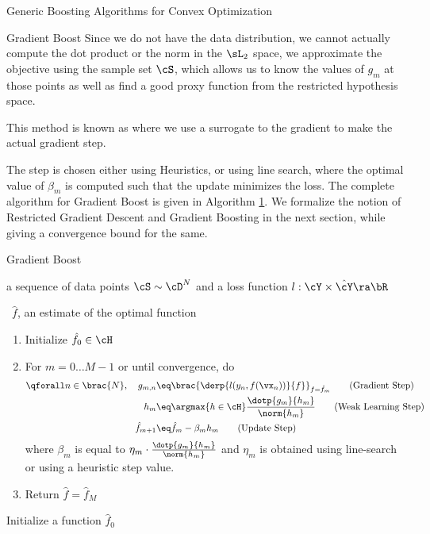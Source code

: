 \documentclass{article}
\begin{document}
\begin{psection}{Generic Boosting Algorithms for Convex Optimization}
\begin{psubsection}{Gradient Boost}
		Since we do not have the data distribution, we cannot actually compute the dot product or the norm in the $\sL_2$ space, we approximate the objective using the sample set $\cS$, which allows us to know the values of $g_m$ at those points as well as find a good proxy function from the restricted hypothesis space.

		This method is known as  where we use a surrogate to the gradient to make the actual gradient step.

		The step is chosen either using Heuristics, or using line search, where the optimal value of $\beta_m$ is computed such that the update minimizes the loss. The complete algorithm for Gradient Boost is given in Algorithm \hyperlink{algo:1}{1}. We formalize the notion of Restricted Gradient Descent and Gradient Boosting in the next section, while giving a convergence bound for the same.

	\end{psubsection}

	\begin{algo}[0.8\textwidth]{Gradient Boost}

		 \quad a sequence of data points $\cS \sim \cD^N$ and a loss function $l : \cY \times \hat{\cY} \ra \bR$ \sbr

		\, $\hat{f}$, an estimate of the optimal function


		\begin{enumerate}
			\item Initialize $\hat{f}_0 \in \cH$
			\item For $m = 0 \dots M - 1$ or until convergence, do
				\begin{align}
					\qforall n \in \brac{N}, \quad g_{m, n}	&\eq	\brac{\derp{l(y_n, f(\vx_n))}{f}}_{f = \hat{f}_{m}} \tag{Gradient Step} \\
					h_m										&\eq	\argmax{h \in \cH} \frac{\dotp{g_m}{h_m}}{\norm{h_m}} \tag{Weak Learning Step} \\
					\hat{f}_{m + 1}							&\eq	\hat{f}_m - \beta_m h_m \tag{Update Step}
				\end{align}
				where $\beta_m$ is equal to $\eta_m \cdot \frac{\dotp{g_m}{h_m}}{\norm{h_m}}$ and $\eta_m$ is obtained using line-search or using a heuristic step value.
			\item Return $\hat{f} = \hat{f}_M$
		\end{enumerate}
		Initialize a function $\hat{f}_0$


\end{algo}
\end{psection}
\end{document}
